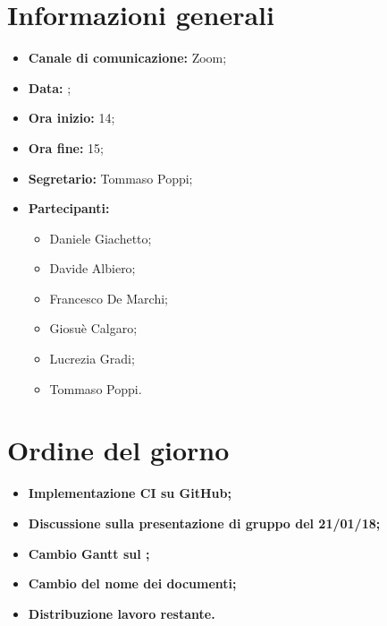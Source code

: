 \section{Informazioni generali}

\begin{itemize}

	\item \textbf{Canale di comunicazione:} Zoom;
	
	\item \textbf{Data:} \DataMeeting{};
	
	\item \textbf{Ora inizio:} 14;
	
	\item \textbf{Ora fine:} 15;
	
	\item \textbf{Segretario:} Tommaso Poppi;
	
	\item \textbf{Partecipanti:}
	
		\begin{itemize}
		
			\item Daniele Giachetto;
			\item Davide Albiero;
			\item Francesco De Marchi;
			\item Giosuè Calgaro;
			\item Lucrezia Gradi;
			\item Tommaso Poppi.
				 
		\end{itemize}

\end{itemize}



\section{Ordine del giorno}

\begin{itemize}

	\item\textbf{Implementazione CI su GitHub;}
	
	\item\textbf{Discussione sulla presentazione di gruppo del 21/01/18;}

	\item\textbf{Cambio Gantt sul \PdP{};}

	\item\textbf{Cambio del nome dei documenti;}
	
	\item\textbf{Distribuzione lavoro restante.}

\end{itemize}

